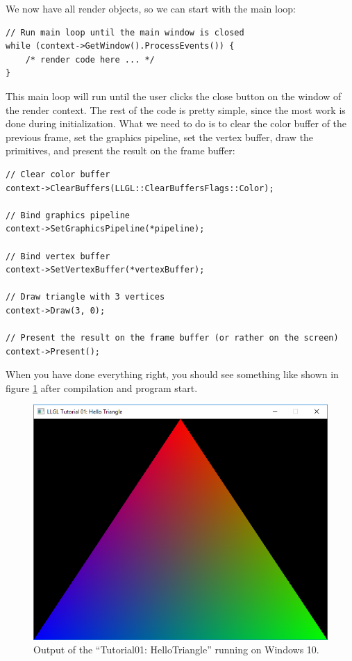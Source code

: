\documentclass{article}
\begin{document}
We now have all render objects, so we can start with the main loop:
\begin{lstlisting}
// Run main loop until the main window is closed
while (context->GetWindow().ProcessEvents()) {
    /* render code here ... */
}
\end{lstlisting}
This main loop will run until the user clicks the close button on the window of the render context.
The rest of the code is pretty simple, since the most work is done during initialization.
What we need to do is to clear the color buffer of the previous frame,
set the graphics pipeline, set the vertex buffer, draw the primitives, and present the result on the frame buffer:
\begin{lstlisting}
// Clear color buffer
context->ClearBuffers(LLGL::ClearBuffersFlags::Color);

// Bind graphics pipeline
context->SetGraphicsPipeline(*pipeline);

// Bind vertex buffer
context->SetVertexBuffer(*vertexBuffer);

// Draw triangle with 3 vertices
context->Draw(3, 0);

// Present the result on the frame buffer (or rather on the screen)
context->Present();
\end{lstlisting}
When you have done everything right, you should see something like shown in figure \ref{fig:tut01_mask1} after compilation
and program start.
\begin{figure}[H]
	\centering
	\includegraphics[width=0.8 \textwidth]{tut01_mask1a}
	\caption{Output of the ``Tutorial01: HelloTriangle'' running on Windows 10.}
	\label{fig:tut01_mask1}
\end{figure}







\end{document}
